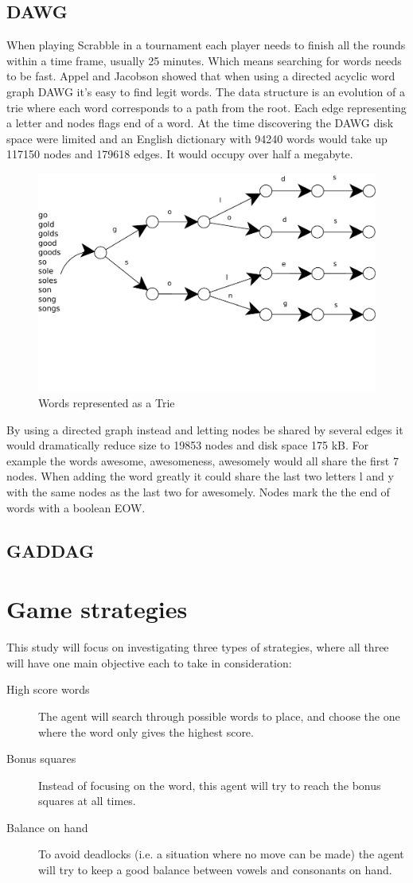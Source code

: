 \documentclass[a4paper, 12pt]{report}
\begin{document}
\subsection{DAWG}
When playing Scrabble in a tournament each player needs to finish all the rounds within a time frame, usually 25 minutes. Which means searching for words needs to be fast. Appel and Jacobson showed that when using a directed acyclic word graph DAWG it's easy to find legit words. The data structure is an evolution of a trie where each word corresponds to a path from the root. Each edge representing a letter and nodes flags end of a word. At the time discovering the DAWG disk space were limited and an English dictionary with 94240 words would take up 117150 nodes and 179618 edges. It would occupy over half a megabyte.
\begin{figure}
\centering
\includegraphics[scale=0.6]{trie}
\caption{Words represented as a Trie}
\end{figure}
By using a directed graph instead and letting nodes be shared by several edges it would dramatically reduce size to 19853 nodes and disk space 175 kB. For example the words awesome, awesomeness, awesomely would all share the first 7 nodes. When adding the word greatly it could share the last two letters l and y with the same nodes as the last two for awesomely. Nodes mark the the end of words with a boolean EOW.
\subsection{GADDAG}
\section{Game strategies}
This study will focus on investigating three types of strategies, where all three will have one main objective each to take in consideration:
\begin{description}
\item[High score words] The agent will search through possible words to place, and choose the one where the word only gives the highest score.
\item[Bonus squares] Instead of focusing on the word, this agent will try to reach the bonus squares at all times.
\item[Balance on hand] To avoid deadlocks (i.e. a situation where no move can be made) the agent will try to keep a good balance between vowels and consonants on hand. 
\end{description}
\end{document}
